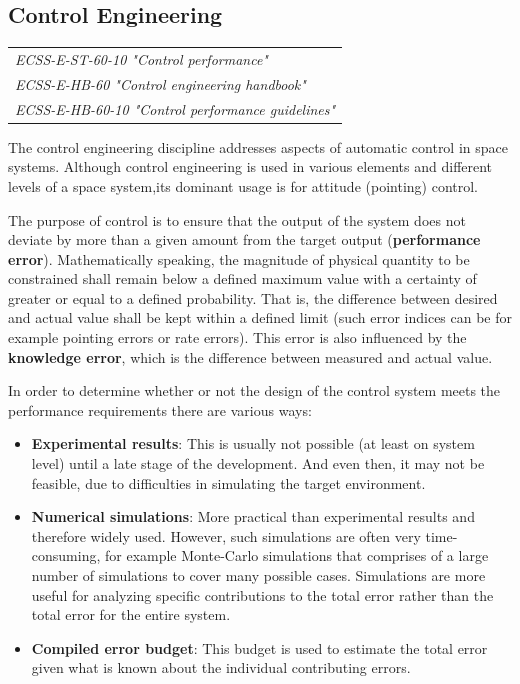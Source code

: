 \subsection{Control Engineering}

\begin{tabular}{l}
\textit{ECSS-E-ST-60-10 "Control performance" \cite{ECSS-E-ST-60-10}} \\
\textit{ECSS-E-HB-60 "Control engineering handbook" \cite{ECSS-E-HB-60}} \\
\textit{ECSS-E-HB-60-10 "Control performance guidelines" \cite{ECSS-E-HB-60-10}}
\end{tabular}

The control engineering discipline addresses aspects of automatic control in space systems. Although control engineering is used in various elements and different levels of a space system,its dominant usage is for attitude (pointing) control. 

The purpose of control is to ensure that the output of the system does not deviate by more than a given amount from the target output (\textbf{performance error}). Mathematically speaking, the magnitude of physical quantity to be constrained shall remain below a defined maximum value with a certainty of greater or equal to a defined probability. That is, the difference between desired and actual value shall be kept within a defined limit (such error indices can be for example pointing errors or rate errors). This error is also influenced by the \textbf{knowledge error}, which is the difference between measured and actual value.

In order to determine whether or not the design of the control system meets the performance requirements there are various ways:

\begin{itemize}
\item \textbf{Experimental results}: This is usually not possible (at least on system level) until a late stage of the development. And even then, it may not be feasible, due to difficulties in simulating the target environment.
\item \textbf{Numerical simulations}: More practical than experimental results and therefore widely used. However, such simulations are often very time-consuming, for example Monte-Carlo simulations that comprises of a large number of simulations to cover many possible cases. Simulations are more useful for analyzing specific contributions to the total error rather than the total error for the entire system.
\item \textbf{Compiled error budget}: This budget is used to estimate the total error given what is known about the individual contributing errors.
\end{itemize}


